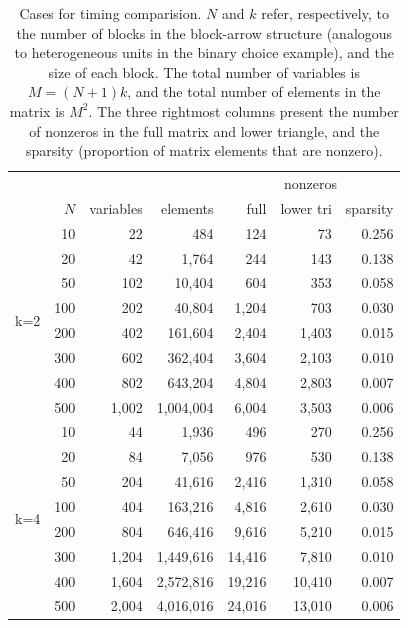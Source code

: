\documentclass[codesnippet]{jss}\usepackage[]{graphicx}\usepackage[]{color}
\begin{document}
\begin{table}\centering
  \begin{tabular}{rrrrrrr}
    \toprule
    &&&&\multicolumn{3}{c}{nonzeros}\\
    \cmidrule(lr){5-7}
    &$N$&variables&elements&full&lower tri&sparsity\\
    \midrule
 \multirow{8}{*}{k=2} & 10 & 22 & 484 & 124 & 73 & 0.256 \\ 
   & 20 & 42 & 1,764 & 244 & 143 & 0.138 \\ 
   & 50 & 102 & 10,404 & 604 & 353 & 0.058 \\ 
   & 100 & 202 & 40,804 & 1,204 & 703 & 0.030 \\ 
   & 200 & 402 & 161,604 & 2,404 & 1,403 & 0.015 \\ 
   & 300 & 602 & 362,404 & 3,604 & 2,103 & 0.010 \\ 
   & 400 & 802 & 643,204 & 4,804 & 2,803 & 0.007 \\ 
   & 500 & 1,002 & 1,004,004 & 6,004 & 3,503 & 0.006 \\ 
   \midrule
\multirow{8}{*}{k=4} & 10 & 44 & 1,936 & 496 & 270 & 0.256 \\ 
   & 20 & 84 & 7,056 & 976 & 530 & 0.138 \\ 
   & 50 & 204 & 41,616 & 2,416 & 1,310 & 0.058 \\ 
   & 100 & 404 & 163,216 & 4,816 & 2,610 & 0.030 \\ 
   & 200 & 804 & 646,416 & 9,616 & 5,210 & 0.015 \\ 
   & 300 & 1,204 & 1,449,616 & 14,416 & 7,810 & 0.010 \\ 
   & 400 & 1,604 & 2,572,816 & 19,216 & 10,410 & 0.007 \\ 
   & 500 & 2,004 & 4,016,016 & 24,016 & 13,010 & 0.006 \\ 
  
\bottomrule
\end{tabular}
\caption{Cases for timing comparision. $N$ and $k$ refer,
  respectively, to the number of blocks in
  the block-arrow structure (analogous to heterogeneous units in the
  binary choice example), and the size of each block.  The total
  number of variables is $M=(N+1)k$, and the total number of elements
  in the matrix is $M^2$. The three rightmost columns present the
  number of nonzeros in the full matrix and lower triangle, and the
  sparsity (proportion of matrix elements that are nonzero).}\label{tab:cases}
\end{table}
\end{document}
